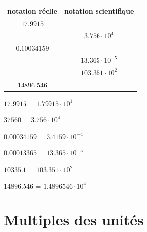 \documentclass[
  11pt,
  a4paper,
  openany]{book}
\begin{document}
\begin{longtable}[]{@{}cc@{}}
\toprule\noalign{}
notation réelle & notation scientifique \\
\midrule\noalign{}
\endhead
\bottomrule\noalign{}
\endlastfoot
\(17.9915\) & \\
& \(3.756 \cdot 10^{4}\) \\
\(0.00034159\) & \\
& \(13.365 \cdot 10^{-5}\) \\
& \(103.351 \cdot 10 ^{2}\) \\
\(14896.546\) & \\
\end{longtable}

\begin{Answer}
\(17.9915\) = \(1.79915 \cdot 10^{1}\)

\(37560\) = \(3.756 \cdot 10^{4}\)

\(0.00034159\) = \(3.4159 \cdot 10^{-4}\)

\(0.00013365\) = \(13.365 \cdot 10^{-5}\)

\(10335.1\) = \(103.351 \cdot 10 ^{2}\)

\(14896.546\) = \(1.4896546 \cdot 10^{4}\)

\end{Answer}

\section{Multiples des unités}\label{multiples-des-unituxe9s}
\end{document}
